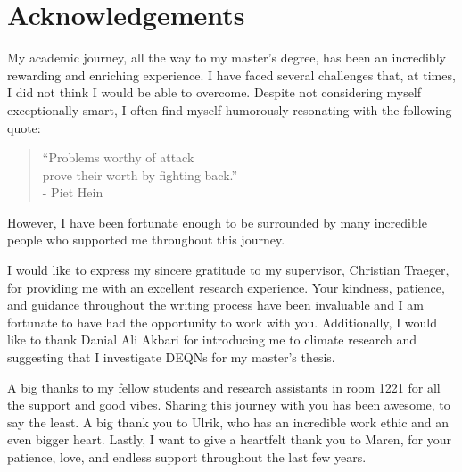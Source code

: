 \section*{Acknowledgements}

My academic journey, all the way to my master's degree, has been an incredibly rewarding and enriching experience. I have faced several challenges that, at times, I did not think I would be able to overcome. Despite not considering myself exceptionally smart, I often find myself humorously resonating with the following quote: 

\begin{quote}
\enquote{Problems worthy of attack \\prove their worth by fighting back.}\\ - Piet Hein
\end{quote}

However, I have been fortunate enough to be surrounded by many incredible people who supported me throughout this journey.


I would like to express my sincere gratitude to my supervisor, Christian Traeger, for providing me with an excellent research experience. Your kindness, patience, and guidance throughout the writing process have been invaluable and I am fortunate to have had the opportunity to work with you. Additionally, I would like to thank Danial Ali Akbari for introducing me to climate research and suggesting that I investigate DEQNs for my master's thesis.

A big thanks to my fellow students and research assistants in room 1221 for all the support and good vibes. Sharing this journey with you has been awesome, to say the least. A big thank you to Ulrik, who has an incredible work ethic and an even bigger heart. Lastly, I want to give a heartfelt thank you to Maren, for your patience, love, and endless support throughout the last few years.